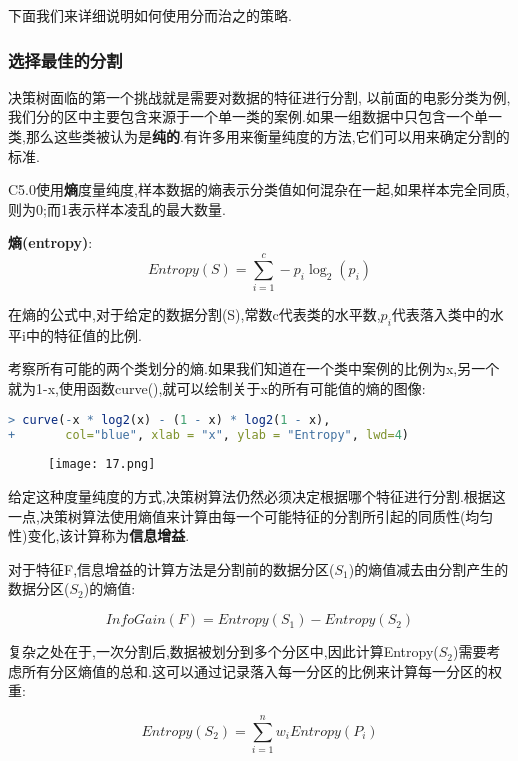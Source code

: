 \documentclass[11pt,a4paper,oneside]{book}
\begin{document}
下面我们来详细说明如何使用分而治之的策略.

\subsubsection{选择最佳的分割}
决策树面临的第一个挑战就是需要对数据的特征进行分割, 以前面的电影分类为例,我们分的区中主要包含来源于一个单一类的案例.如果一组数据中只包含一个单一类,那么这些类被认为是\textbf{纯的}.有许多用来衡量纯度的方法,它们可以用来确定分割的标准.

C5.0使用\textbf{熵}度量纯度,样本数据的熵表示分类值如何混杂在一起,如果样本完全同质,则为0;而1表示样本凌乱的最大数量.

\begin{tcolorbox}[colback=blue!7!white,colframe=blue!40]
\textbf{熵(entropy)}: 
\begin{equation}
Entropy(S)=\sum^c_{i=1}-p_i\log_2(p_i)
\end{equation}
\end{tcolorbox}
在熵的公式中,对于给定的数据分割(S),常数c代表类的水平数,$p_i$代表落入类中的水平i中的特征值的比例.

考察所有可能的两个类划分的熵.如果我们知道在一个类中案例的比例为x,另一个就为1-x,使用函数curve(),就可以绘制关于x的所有可能值的熵的图像:
\begin{lstlisting}[language=r]
> curve(-x * log2(x) - (1 - x) * log2(1 - x),
+       col="blue", xlab = "x", ylab = "Entropy", lwd=4)
\end{lstlisting}
\begin{figure}[H]
	\centering
	\texttt{[image: 17.png]}
\end{figure}

给定这种度量纯度的方式,决策树算法仍然必须决定根据哪个特征进行分割.根据这一点,决策树算法使用熵值来计算由每一个可能特征的分割所引起的同质性(均匀性)变化,该计算称为\textbf{信息增益}.

对于特征F,信息增益的计算方法是分割前的数据分区($S_1$)的熵值减去由分割产生的数据分区($S_2$)的熵值:
\begin{tcolorbox}[colback=blue!7!white,colframe=blue!40]
	\begin{equation}
InfoGain(F)=Entropy(S_1)-Entropy(S_2)
	\end{equation}
\end{tcolorbox}

复杂之处在于,一次分割后,数据被划分到多个分区中,因此计算Entropy($S_2$)需要考虑所有分区熵值的总和.这可以通过记录落入每一分区的比例来计算每一分区的权重:
\begin{tcolorbox}[colback=blue!7!white,colframe=blue!40]
	\begin{equation}
Entropy(S_2)=\sum^n_{i=1}w_iEntropy(P_i)
	\end{equation}
\end{tcolorbox}
\end{document}
